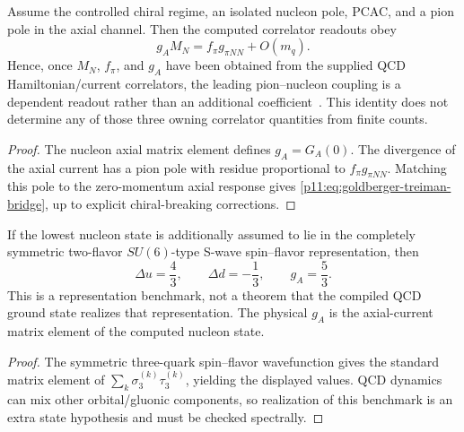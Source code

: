 \documentclass[12pt,a4paper]{article}
\begin{document}
\begin{theorem}
\label{p11:thm:native-goldberger-treiman-bridge}
Assume the controlled chiral regime, an isolated nucleon pole, PCAC, and a pion pole in the axial channel.  Then the computed correlator readouts obey
\begin{equation}
\label{p11:eq:goldberger-treiman-bridge}
g_A M_N=f_\pi g_{\pi NN}+O(m_q).
\end{equation}
Hence, once \(M_N\), \(f_\pi\), and \(g_A\) have been obtained from the supplied QCD Hamiltonian/current correlators, the leading pion--nucleon coupling is a dependent readout rather than an additional coefficient~\cite{GoldbergerTreiman1958}.  This identity does not determine any of those three owning correlator quantities from finite counts.
\end{theorem}
\begin{proof}
The nucleon axial matrix element defines \(g_A=G_A(0)\). The divergence of the axial current has a pion pole with residue proportional to \(f_\pi g_{\pi NN}\). Matching this pole to the zero-momentum axial response gives \eqref{p11:eq:goldberger-treiman-bridge}, up to explicit chiral-breaking corrections.
\end{proof}


\begin{theorem}
\label{p11:thm:leading-native-nucleon-axial-charge}

If the lowest nucleon state is additionally assumed to lie in the completely symmetric two-flavor \(SU(6)\)-type S-wave spin--flavor representation, then
\[
\Delta u=\frac43,\qquad \Delta d=-\frac13,\qquad g_A=\frac53.
\]
This is a representation benchmark, not a theorem that the compiled QCD ground state realizes that representation.  The physical \(g_A\) is the axial-current matrix element of the computed nucleon state.
\label{p11:eq:leading-native-ga}
\label{p11:eq:leading-native-ga-five-thirds}
\end{theorem}
\begin{proof}

The symmetric three-quark spin--flavor wavefunction gives the standard matrix element of \(\sum_k\sigma_3^{(k)}\tau_3^{(k)}\), yielding the displayed values.  QCD dynamics can mix other orbital/gluonic components, so realization of this benchmark is an extra state hypothesis and must be checked spectrally.
\end{proof}
\end{document}
